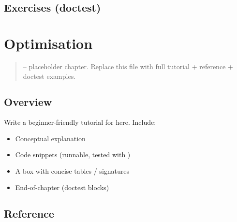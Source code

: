 \documentclass[a4paper,11pt,english]{sphinxmanual}
\begin{document}
\subsection{Exercises (doctest)}
\label{\detokenize{packaging/versioning:exercises-doctest}}
\begin{sphinxVerbatim}[commandchars=\\\{\}]
\end{sphinxVerbatim}

\sphinxstepscope


\section{Optimisation}
\label{\detokenize{performance/optimisation:optimisation}}\label{\detokenize{performance/optimisation::doc}}\begin{quote}

\sphinxAtStartPar
{} – placeholder chapter. Replace this file with full tutorial + reference + doctest examples.
\end{quote}


\subsection{Overview}
\label{\detokenize{performance/optimisation:overview}}
\sphinxAtStartPar
Write a beginner‑friendly tutorial for  here. Include:
\begin{itemize}
\item {} 
\sphinxAtStartPar
Conceptual explanation

\item {} 
\sphinxAtStartPar
Code snippets (runnable, tested with )

\item {} 
\sphinxAtStartPar
A  box with concise tables / signatures

\item {} 
\sphinxAtStartPar
End‑of‑chapter  (doctest blocks)

\end{itemize}


\subsection{Reference}
\label{\detokenize{performance/optimisation:reference}}
\end{document}
